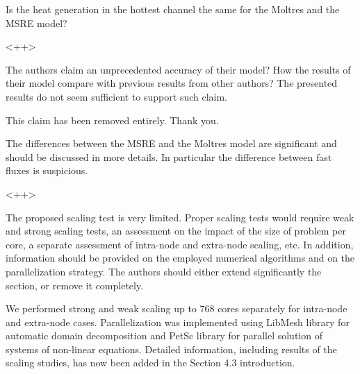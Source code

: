 \documentclass[answers,11pt]{exam}
\begin{document}
\begin{questions}
\question Is the heat generation in the hottest channel the same for the Moltres and the MSRE model?
\begin{solution}
        <++>
\end{solution}

\question The authors claim an unprecedented accuracy of their model? How the
results of their model compare with previous results from other authors? The
presented results do not seem sufficient to support such claim.
\begin{solution}
        This claim has been removed entirely. Thank you.
\end{solution}

\question The differences between the MSRE and the Moltres model are significant
and should be discussed in more details. In particular the difference between
fast fluxes is suspicious.
\begin{solution}
        <++>
\end{solution}

\question The proposed scaling test is very limited. Proper scaling tests would
require weak and strong scaling tests, an assessment on the impact of the size
of problem per core, a separate assessment of intra-node and extra-node scaling,
etc. In addition, information should be provided on the employed numerical
algorithms and on the parallelization strategy. The authors should either extend
significantly the section, or remove it completely.
\begin{solution}
        We performed strong and weak scaling up to 768 cores separately for
        intra-node and extra-node cases. Parallelization was implemented using
        LibMesh library for automatic domain decomposition and PetSc
        library for parallel solution of systems of non-linear equations.
        Detailed information, including results of the scaling studies, has now
        been added in the Section 4.3 introduction.
\end{solution}


\end{questions}


  
\end{document}
